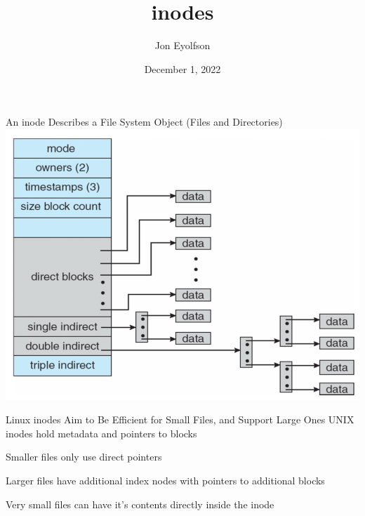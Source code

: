

\title{inodes}
\author{Jon Eyolfson}
\date{December 1, 2022}


  \begin{frame}
    \titlepage
  \end{frame}

  \begin{frame}{An inode Describes a File System Object (Files and Directories)}
    \includegraphics[height=0.8\textheight]{hinode.png}
  \end{frame}

  \begin{frame}{Linux inodes Aim to Be Efficient for Small Files, and Support
                Large Ones}
    UNIX inodes hold metadata and pointers to blocks

    \vspace{2em}

    Smaller files only use direct pointers

    \vspace{2em}

    Larger files have additional index nodes with pointers to additional blocks

    \vspace{2em}

    Very small files can have it's contents directly inside the inode
  \end{frame}

